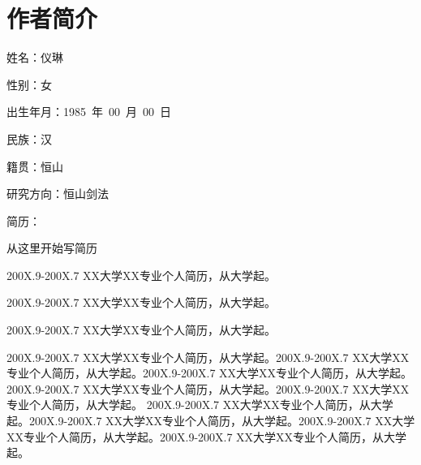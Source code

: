 
%
%

\chapter*{\hfill 作者简介 \hfill}
\begin{window}
\end{window}
\daxiaosi
姓名：仪琳

性别：女

出生年月：1985~年~00~月~00~日

民族：汉

籍贯：恒山

研究方向：恒山剑法

简历：

\xiaosi
从这里开始写简历

200X.9-200X.7  XX大学XX专业个人简历，从大学起。

200X.9-200X.7  XX大学XX专业个人简历，从大学起。

200X.9-200X.7  XX大学XX专业个人简历，从大学起。

200X.9-200X.7  XX大学XX专业个人简历，从大学起。200X.9-200X.7  XX大学XX专业个人简历，从大学起。200X.9-200X.7  XX大学XX专业个人简历，从大学起。200X.9-200X.7  XX大学XX专业个人简历，从大学起。200X.9-200X.7  XX大学XX专业个人简历，从大学起。
200X.9-200X.7  XX大学XX专业个人简历，从大学起。200X.9-200X.7  XX大学XX专业个人简历，从大学起。200X.9-200X.7  XX大学XX专业个人简历，从大学起。200X.9-200X.7  XX大学XX专业个人简历，从大学起。
